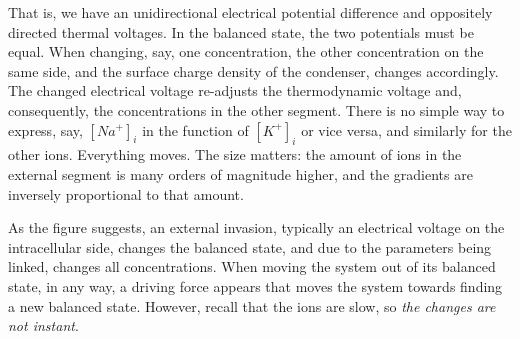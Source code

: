 \fi
 

\ifx\magyar\undefined
That is, we have an unidirectional electrical potential difference and oppositely directed thermal voltages. In the balanced state, the two potentials must be equal.
When changing, say, one concentration, the other concentration on the same side, and the surface charge density of the condenser, changes accordingly.  The changed electrical voltage 
re-adjusts the thermodynamic voltage and, consequently, the concentrations in the other segment.
There is no simple way to express, say,
$[Na^+]_i$ in the function of $[K^+]_i$ or vice versa, and similarly for the other ions. Everything moves.
The size matters: the amount of ions in the external segment is many orders of magnitude higher, and the gradients are inversely proportional to that amount.

As the figure suggests, an external invasion, typically an electrical voltage on the intracellular side, changes the balanced state, and due to the parameters being linked,
changes all concentrations. When moving the system out of
its balanced state, in any way, a driving force appears that moves the system towards finding a new balanced state. However, recall that the ions are slow, so \textit{the changes are not instant}.
\else

